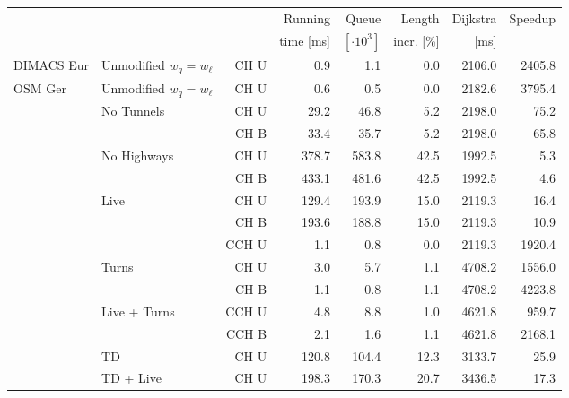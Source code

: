 \begin{tabular}{llrrrrrr}
\toprule
 & & &   Running &                Queue &     Length & Dijkstra & Speedup \\ & & & time [ms] & $[\cdot 10^3]$ & incr. [\%] &     [ms] &         \\
\midrule
DIMACS Eur & Unmodified $w_q = w_{\ell}$ & CH U &              0.9 &              1.1 &       0.0 &                    2106.0 &   2405.8 \\
\addlinespace
OSM Ger & Unmodified $w_q = w_{\ell}$ & CH U &              0.6 &              0.5 &       0.0 &                    2182.6 &   3795.4 \\[2pt]
        & No Tunnels & CH U &             29.2 &             46.8 &       5.2 &                    2198.0 &     75.2 \\
        &    & CH B &             33.4 &             35.7 &       5.2 &                    2198.0 &     65.8 \\[2pt]
        & No Highways & CH U &            378.7 &            583.8 &      42.5 &                    1992.5 &      5.3 \\
        &    & CH B &            433.1 &            481.6 &      42.5 &                    1992.5 &      4.6 \\[2pt]
        & Live & CH U &            129.4 &            193.9 &      15.0 &                    2119.3 &     16.4 \\
        &    & CH B &            193.6 &            188.8 &      15.0 &                    2119.3 &     10.9 \\
        &    & CCH U &              1.1 &              0.8 &       0.0 &                    2119.3 &   1920.4 \\[2pt]
        & Turns & CH U &              3.0 &              5.7 &       1.1 &                    4708.2 &   1556.0 \\
        &    & CH B &              1.1 &              0.8 &       1.1 &                    4708.2 &   4223.8 \\[2pt]
        & Live + Turns & CCH U &              4.8 &              8.8 &       1.0 &                    4621.8 &    959.7 \\
        &    & CCH B &              2.1 &              1.6 &       1.1 &                    4621.8 &   2168.1 \\[2pt]
        & TD & CH U &            120.8 &            104.4 &      12.3 &                    3133.7 &     25.9 \\
        & TD + Live & CH U &            198.3 &            170.3 &      20.7 &                    3436.5 &     17.3 \\

\end{tabular}
